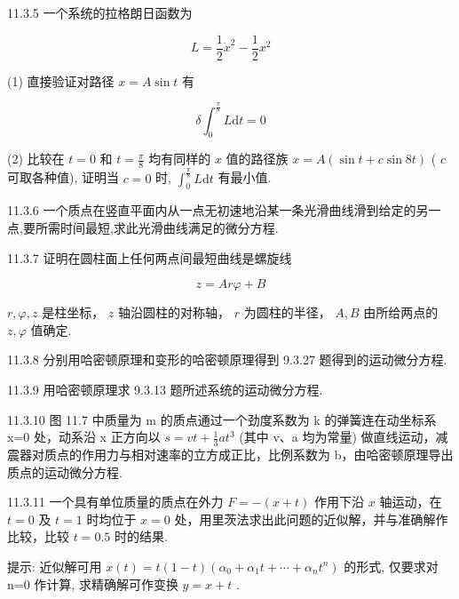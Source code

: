 \begin{problem}{11.3.5}
一个系统的拉格朗日函数为

\[
L = \frac {1}{2} \dot {x} ^ {2} - \frac {1}{2} x ^ {2}
\]

(1) 直接验证对路径 $x = A \sin t$ 有

\[
\delta \int_ {0} ^ {\frac {\pi}{8}} L \mathrm{d} t = 0
\]

(2) 比较在 $t = 0$ 和 $t = \frac{\pi}{8}$ 均有同样的 $x$ 值的路径族 $x = A(\sin t + c\sin 8t)$ ( $c$ 可取各种值), 证明当 $c = 0$ 时, $\int_{0}^{\frac{\pi}{8}} L \mathrm{d}t$ 有最小值.
\end{problem}
\clearpage


\begin{problem}{11.3.6}
一个质点在竖直平面内从一点无初速地沿某一条光滑曲线滑到给定的另一点,要所需时间最短,求此光滑曲线满足的微分方程.
\end{problem}
\clearpage


\begin{problem}{11.3.7}
证明在圆柱面上任何两点间最短曲线是螺旋线

\[
z = A r \varphi + B
\]

$r, \varphi, z$ 是柱坐标， $z$ 轴沿圆柱的对称轴， $r$ 为圆柱的半径， $A, B$ 由所给两点的 $z, \varphi$ 值确定.
\end{problem}
\clearpage


\begin{problem}{11.3.8}
分别用哈密顿原理和变形的哈密顿原理得到 9.3.27 题得到的运动微分方程.
\end{problem}
\clearpage


\begin{problem}{11.3.9}
用哈密顿原理求 9.3.13 题所述系统的运动微分方程.
\end{problem}
\clearpage


\begin{problem}{11.3.10}
图 11.7 中质量为 m 的质点通过一个劲度系数为 k 的弹簧连在动坐标系 x=0 处，动系沿 x 正方向以 $s=vt+\frac{1}{3}at^{3}$ (其中 v、a 均为常量) 做直线运动，减震器对质点的作用力与相对速率的立方成正比，比例系数为 b，由哈密顿原理导出质点的运动微分方程.
\begin{center}

\end{center}
\end{problem}
\clearpage


\begin{problem}{11.3.11}
一个具有单位质量的质点在外力 $F = -(x + t)$ 作用下沿 $x$ 轴运动，在 $t = 0$ 及 $t = 1$ 时均位于 $x = 0$ 处，用里茨法求出此问题的近似解，并与准确解作比较，比较 $t = 0.5$ 时的结果.

提示: 近似解可用 $x(t)=t(1-t)(\alpha_{0}+\alpha_{1}t+\cdots+\alpha_{n}t^{n})$ 的形式, 仅要求对 n=0 作计算, 求精确解可作变换 $y=x+t$ .
\end{problem}
\clearpage


